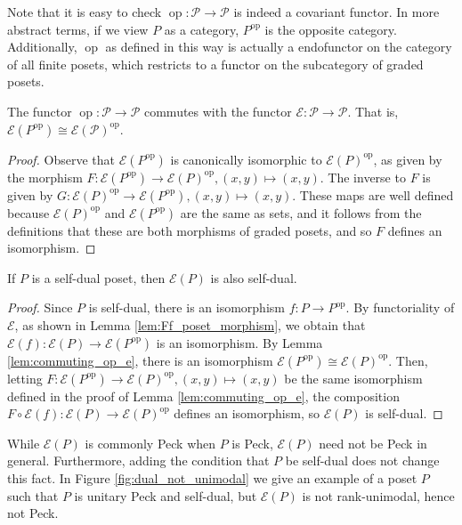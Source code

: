 \documentclass[smallextended, envcountsame, numbook]{svjour3}
\numberwithin{equation}{section}
\newcommand\op{\operatorname{op}}
\begin{document}
\begin{remark}
Note that it is easy to check $\op\colon\mathcal P \rightarrow \mathcal P$ is indeed a covariant functor. In more abstract terms, if we view $P$ as a category, $P^{\op}$ is the opposite category. Additionally, $\op$ as defined in this way is actually a endofunctor on the category of all finite posets, which restricts to a functor on the subcategory of graded posets.
\end{remark}

\begin{lemma}
\label{lem:commuting_op_e}
The functor $\op\colon\mathcal P \rightarrow \mathcal P$ commutes with the functor $\mathcal E\colon\mathcal P \rightarrow \mathcal P$. That is, $\mathcal E(P^{\op}) \cong \mathcal E(\mathcal P)^{\op}$.
\end{lemma}
\begin{proof}
Observe that $\mathcal E(P^{\op})$ is canonically isomorphic to $\mathcal E(P)^{\op}$, as given by the morphism $F\colon\mathcal E(P^{\op}) \rightarrow \mathcal E(P)^{\op},(x,y) \mapsto (x,y)$. The inverse to $F$ is given by $G\colon\mathcal E(P)^{\op} \rightarrow \mathcal E(P^{\op}),(x,y)\mapsto (x,y)$. These maps are well defined because $\mathcal E(P)^{\op}$ and $\mathcal E(P^{\op})$ are the same as sets, and it follows from the definitions that these are both morphisms of graded posets, and so $F$ defines an isomorphism.
\end{proof}

\begin{proposition}
\label{prop:self_dual_preservation}
If $P$ is a self-dual poset, then $\mathcal E(P)$ is also self-dual.
\end{proposition}
\begin{proof}
Since $P$ is self-dual, there is an isomorphism $f\colon P \rightarrow P^{\op}$. By functoriality of $\mathcal E$, as shown in Lemma \ref{lem:Ff_poset_morphism}, we obtain that $\mathcal E(f)\colon\mathcal E(P) \rightarrow \mathcal E(P^{\op})$ is an isomorphism. By Lemma \ref{lem:commuting_op_e}, there is an isomorphism $\mathcal E(P^{\op}) \cong \mathcal E(P)^{\op}$. Then, letting $F\colon\mathcal E(P^{\op}) \rightarrow \mathcal E(P)^{\op},(x,y) \mapsto (x,y)$ be the same isomorphism defined in the proof of Lemma \ref{lem:commuting_op_e}, the composition $F\circ \mathcal E(f)\colon\mathcal E(P) \rightarrow \mathcal E(P)^{\op}$ defines an isomorphism, so $\mathcal E(P)$ is self-dual.
\end{proof}


\begin{example}
While $\mathcal{E}(P)$ is commonly Peck when $P$ is Peck, $\mathcal E(P)$ need not be Peck in general.  Furthermore, adding the condition that $P$ be self-dual does not change this fact.  In Figure \ref{fig:dual_not_unimodal} we give an example of a poset $P$ such that $P$ is unitary Peck and self-dual, but $\mathcal{E}(P)$ is not rank-unimodal, hence not Peck.
\end{example}
\end{document}
